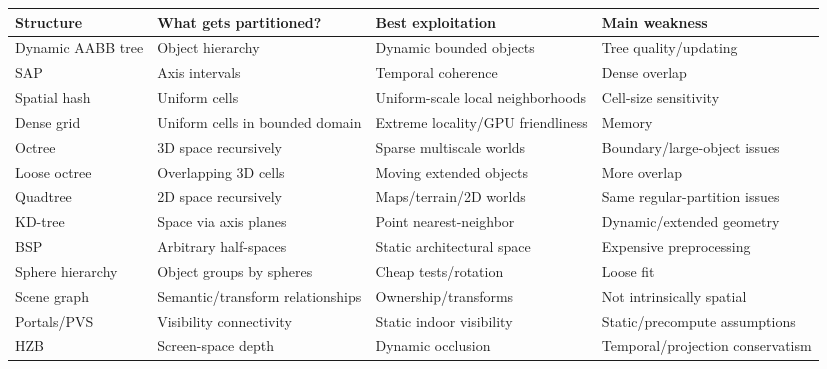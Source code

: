 {\def\LTcaptype{none} %
\begin{longtable}[]{@{}
  >{\raggedright\arraybackslash}p{}
  >{\raggedright\arraybackslash}p{}
  >{\raggedright\arraybackslash}p{}
  >{\raggedright\arraybackslash}p{}@{}}
\toprule\noalign{}
\begin{minipage}[b]{\linewidth}\raggedright
Structure
\end{minipage} & \begin{minipage}[b]{\linewidth}\raggedright
What gets partitioned?
\end{minipage} & \begin{minipage}[b]{\linewidth}\raggedright
Best exploitation
\end{minipage} & \begin{minipage}[b]{\linewidth}\raggedright
Main weakness
\end{minipage} \\
\midrule\noalign{}
\endhead
\bottomrule\noalign{}
\endlastfoot
Dynamic AABB tree & Object hierarchy & Dynamic bounded objects & Tree quality/updating \\
SAP & Axis intervals & Temporal coherence & Dense overlap \\
Spatial hash & Uniform cells & Uniform-scale local neighborhoods & Cell-size sensitivity \\
Dense grid & Uniform cells in bounded domain & Extreme locality/GPU friendliness & Memory \\
Octree & 3D space recursively & Sparse multiscale worlds & Boundary/large-object issues \\
Loose octree & Overlapping 3D cells & Moving extended objects & More overlap \\
Quadtree & 2D space recursively & Maps/terrain/2D worlds & Same regular-partition issues \\
KD-tree & Space via axis planes & Point nearest-neighbor & Dynamic/extended geometry \\
BSP & Arbitrary half-spaces & Static architectural space & Expensive preprocessing \\
Sphere hierarchy & Object groups by spheres & Cheap tests/rotation & Loose fit \\
Scene graph & Semantic/transform relationships & Ownership/transforms & Not intrinsically spatial \\
Portals/PVS & Visibility connectivity & Static indoor visibility & Static/precompute assumptions \\
HZB & Screen-space depth & Dynamic occlusion & Temporal/projection conservatism \\
\end{longtable}
}

